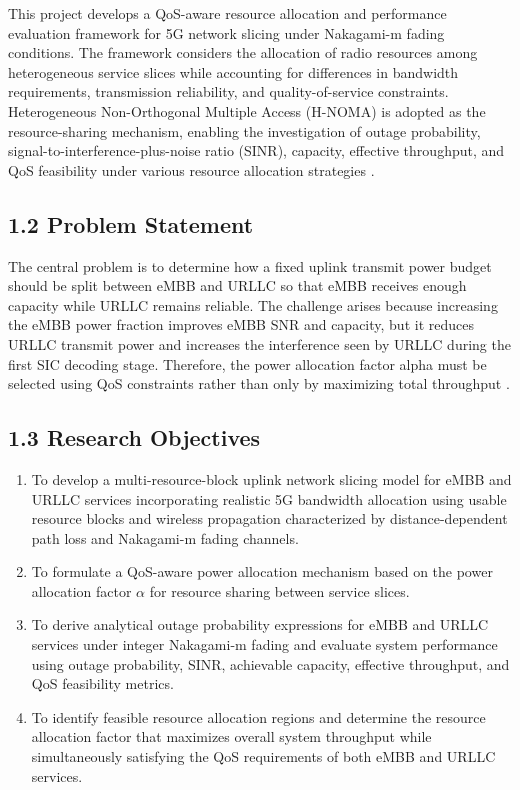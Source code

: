 \documentclass[
]{article}
\begin{document}
This project develops a QoS-aware resource allocation and performance evaluation framework for 5G network slicing under Nakagami-m fading conditions. The framework considers the allocation of radio resources among heterogeneous service slices while accounting for differences in bandwidth requirements, transmission reliability, and quality-of-service constraints. Heterogeneous Non-Orthogonal Multiple Access (H-NOMA) is adopted as the resource-sharing mechanism, enabling the investigation of outage probability, signal-to-interference-plus-noise ratio (SINR), capacity, effective throughput, and QoS feasibility under various resource allocation strategies \parencite{Tominaga2021}.

\subsection{1.2 Problem Statement}\label{problem-statement}

The central problem is to determine how a fixed uplink transmit power
budget should be split between eMBB and URLLC so that eMBB receives
enough capacity while URLLC remains reliable. The challenge arises
because increasing the eMBB power fraction improves eMBB SNR and
capacity, but it reduces URLLC transmit power and increases the
interference seen by URLLC during the first SIC decoding stage.
Therefore, the power allocation factor alpha must be selected using QoS
constraints rather than only by maximizing total throughput \parencite{Feng2021}.

\subsection{1.3 Research Objectives}\label{research-objectives}

\begin{enumerate}
\def\labelenumi{\arabic{enumi}.}
\item 
To develop a multi-resource-block uplink network slicing model for eMBB and URLLC services incorporating realistic 5G bandwidth allocation using usable resource blocks and wireless propagation characterized by distance-dependent path loss and Nakagami-m fading channels.
\item
To formulate a QoS-aware power allocation mechanism based on the power allocation factor \(α\) for resource sharing between service slices.
\item
  To derive analytical outage probability expressions for eMBB and URLLC services under integer Nakagami-m fading and evaluate system performance using outage probability, SINR, achievable capacity, effective throughput, and QoS feasibility metrics.
\item
 To identify feasible resource allocation regions and determine the resource allocation factor that maximizes overall system throughput while simultaneously satisfying the QoS requirements of both eMBB and URLLC services. 

\end{enumerate}
\end{document}
